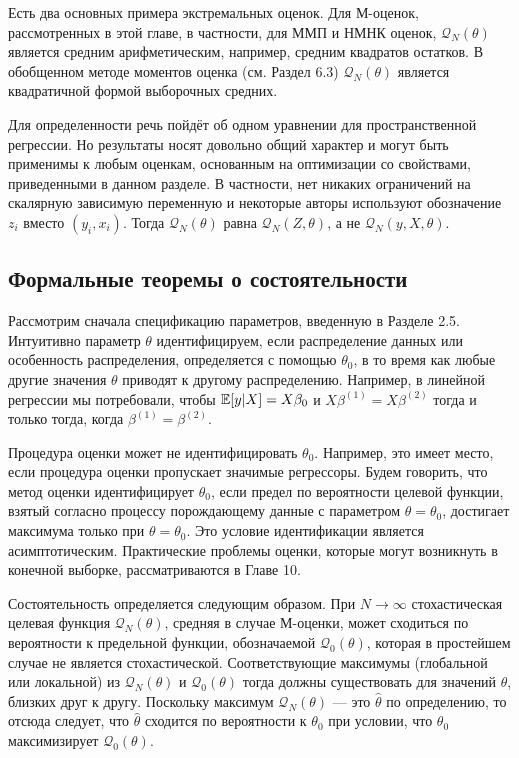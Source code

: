 Есть два основных примера экстремальных оценок. Для М-оценок, рассмотренных в этой главе, в частности, для ММП и НМНК оценок, $\mathcal{Q}_N(\theta)$ является средним арифметическим, например, средним квадратов остатков. В обобщенном методе моментов оценка (см. Раздел 6.3) $\mathcal{Q}_N(\theta)$ является квадратичной формой выборочных средних.

Для определенности речь пойдёт об одном уравнении для пространственной регрессии. Но результаты носят довольно общий характер и могут быть применимы к любым оценкам, основанным на оптимизации со свойствами, приведенными в данном разделе. В частности, нет никаких ограничений на скалярную зависимую переменную и некоторые авторы используют обозначение $z_i$ вместо $(y_i,x_i)$. Тогда $\mathcal{Q}_N(\theta)$ равна $\mathcal{Q}_N(Z,\theta)$, а не $\mathcal{Q}_N(y,X,\theta)$.

\subsection{Формальные теоремы о состоятельности}

Рассмотрим сначала спецификацию параметров, введенную в Разделе 2.5. Интуитивно параметр $\theta$ идентифицируем, если распределение данных или особенность распределения, определяется с помощью $\theta_0$, в то время как любые другие значения $\theta$ приводят к другому распределению. Например, в линейной регрессии мы потребовали, чтобы $\mathbb{E}[y|X]=X\beta_0$ и $X\beta^{(1)}=X\beta^{(2)}$ тогда и только тогда, когда $\beta^{(1)}=\beta^{(2)}$.

Процедура оценки может не идентифицировать $\theta_0$. Например, это имеет место, если процедура оценки пропускает значимые регрессоры. Будем говорить, что метод оценки идентифицирует $\theta_0$, если предел по вероятности целевой функции, взятый согласно процессу порождающему данные с параметром $\theta=\theta_0$, достигает максимума только при $\theta=\theta_0$. Это условие идентификации является асимптотическим. Практические проблемы оценки, которые могут возникнуть в конечной выборке, рассматриваются в Главе 10.

Состоятельность определяется следующим образом. При $ N \rightarrow \infty $ стохастическая целевая функция $\mathcal{Q}_N(\theta)$, средняя в случае М-оценки, может сходиться по вероятности к предельной функции, обозначаемой $\mathcal{Q}_0(\theta)$, которая в простейшем случае не является стохастической. Соответствующие максимумы (глобальной или локальной) из $\mathcal{Q}_N(\theta)$ и $\mathcal{Q}_0(\theta)$ тогда должны существовать для значений $\theta$, близких друг к другу. Поскольку максимум $\mathcal{Q}_N(\theta)$ --- это $\hat{\theta}$ по определению, то отсюда следует, что $\hat{\theta}$ сходится по вероятности к $\theta_0$ при условии, что $\theta_0$ максимизирует $\mathcal{Q}_0(\theta)$.

